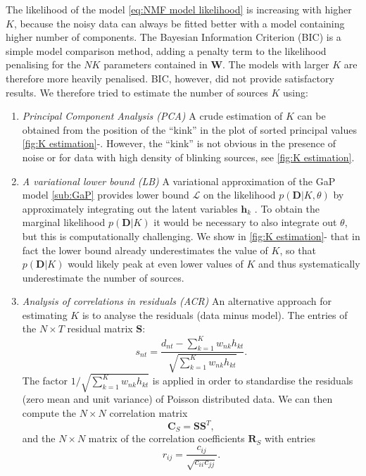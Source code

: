The likelihood of the model \autoref{eq:NMF model likelihood} is increasing with higher $K$, because the noisy data can always be fitted better with a model containing higher number of components. The Bayesian Information Criterion (BIC) \cite{Bishop2006} is a simple model comparison method, adding a penalty term to the likelihood penalising for the $NK$ parameters contained in $\bm{W}$. The models with larger $K$ are therefore more heavily penalised. BIC, however, did not provide satisfactory results. 
We therefore tried to estimate the number of sources $K$ using:
%
\begin{enumerate}
	\item 
	\emph{Principal Component Analysis (PCA)}	
	A crude estimation of $K$ can be obtained from the position of the ``kink'' in the plot of sorted principal values \autoref{fig:K estimation}\aaa-\ccc. However, the ``kink'' is not obvious in the presence of noise or for data with high density of blinking sources, see \autoref{fig:K estimation}\ccc.
	\item
	\emph{A variational lower bound (LB)} 	
	A variational approximation of the GaP model \autoref{sub:GaP} provides lower bound $\mathcal{L}$ on the likelihood $p(\bm{D}|K, \theta)$ by approximately integrating out the latent variables $\bm{h}_k$ \cite{Buntine2006}. To obtain the marginal likelihood $p(\bm{D}|K)$ it would be necessary to also integrate out $\theta$, but this is computationally challenging. We show in \autoref{fig:K estimation}\ddd-\fff{} that in fact the lower bound already underestimates the value of $K$, so that $p(\bm{D}|K)$ would likely peak at even lower values of $K$ and thus systematically underestimate the number of sources.
	
	\item 
	\emph{Analysis of correlations in residuals (ACR)}	
	An alternative approach for estimating $K$ is to analyse the residuals (data minus model). The entries of the $N\times T$ residual matrix $\bm{S}$:
	\begin{equation}
		s_{nt}=\frac{d_{nt}-\sum_{k=1}^K w_{nk}h_{kt}}{\sqrt{\sum_{k=1}^K w_{nk}h_{kt}}}.
	\end{equation}
	The factor $1/\sqrt{\sum_{k=1}^K w_{nk}h_{kt}}$ is applied in order to standardise the residuals (zero mean and unit variance) of Poisson distributed data. We can then compute the $N\times N$ correlation matrix 
	\begin{equation}
		\bm{C}_S=\bm{SS}^T,
	\end{equation}
	and the $N\times N$ matrix of the correlation coefficients $\bm{R}_S$ with entries 
	\begin{equation}
		r_{ij}=\frac{c_{ij}}{\sqrt{c_{ii}c_{jj}}}.
		\label{eq:Correlation in residuals}
	\end{equation}
	

\end{enumerate}
